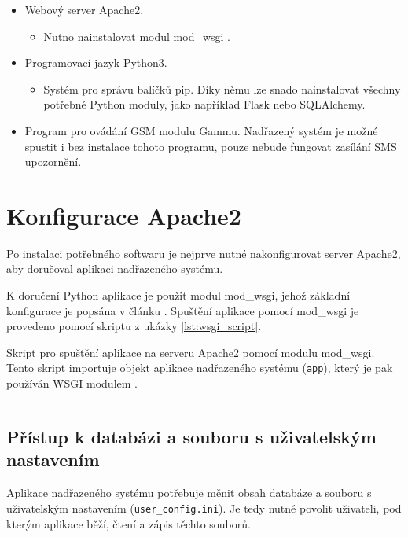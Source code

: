 \begin{itemize}
    \item Webový server Apache2.
    \begin{itemize}
        \item Nutno nainstalovat modul mod\_wsgi  \cite{mod_wsgi}.
    \end{itemize}
    \item Programovací jazyk Python3.
    \begin{itemize}
        \item Systém pro správu balíčků pip. Díky němu lze snado nainstalovat všechny potřebné Python moduly, jako například Flask nebo SQLAlchemy.
    \end{itemize}
    \item Program pro ovádání GSM modulu Gammu. Nadřazený systém je možné spustit i bez instalace tohoto programu, pouze nebude fungovat zasílání SMS upozornění.
\end{itemize}

\newpage

\section{Konfigurace Apache2}

Po instalaci potřebného softwaru je nejprve nutné nakonfigurovat server Apache2, aby doručoval aplikaci nadřazeného systému. 

K doručení Python aplikace je použit modul mod\_wsgi, jehož základní konfigurace je popsána v článku \cite{flask_wsgi}. Spuštění aplikace pomocí mod\_wsgi je provedeno pomocí skriptu z ukázky \ref{lst:wsgi_script}.

\begin{listing}[htbp]
\caption{\label{lst:wsgi_script} Skript pro spuštění aplikace na serveru Apache2 pomocí modulu mod\_wsgi. Tento skript importuje objekt aplikace nadřazeného systému (\texttt{app}), který je pak používán WSGI modulem \cite{flask_wsgi}.}
\inputminted[bgcolor=codebg]{python}{source-samples/wsgi.py}
\end{listing}

\newpage

\subsection{Přístup k databázi a souboru s uživatelským nastavením}

Aplikace nadřazeného systému potřebuje měnit obsah databáze a souboru s uživatelským nastavením (\texttt{user\_config.ini}). Je tedy nutné povolit uživateli, pod kterým aplikace běží, čtení a zápis těchto souborů. 

